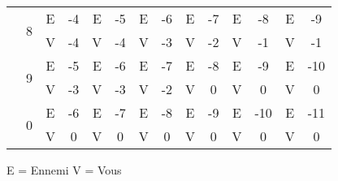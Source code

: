 \documentclass[10pt]{book}
\begin{document}
\begin{minipage}[t]{\textwidth}
{\begin{tabular}{c|c|c c|c c|c c|c c|c c|c c|}
        & \multirow{2}{*}{8}& E&  -4& E&  -5& E&  -6& E&  -7& E&  -8& E&  -9\\
        \cline{3-14}
        & & V&  -4& V&  -4& V&  -3& V&  -2& V&  -1& V&  -1\\
        \cline{2-14}

        & \multirow{2}{*}{9}& E&  -5& E&  -6& E&  -7& E&  -8& E&  -9& E& -10\\
        \cline{3-14}
        & & V&  -3& V&  -3& V&  -2& V& 0& V& 0& V& 0\\
        \cline{2-14}

        & \multirow{2}{*}{0}& E&  -6& E&  -7& E&  -8& E&  -9& E& -10& E& -11\\
        \cline{3-14}
        & & V& 0& V& 0& V& 0& V& 0& V& 0& V& 0\\
        \cline{2-14}
    \end{tabular}}
\end{minipage}

\begin{center}
    E = Ennemi \quad\quad V = Vous
\end{center}

\newpage
\end{document}
